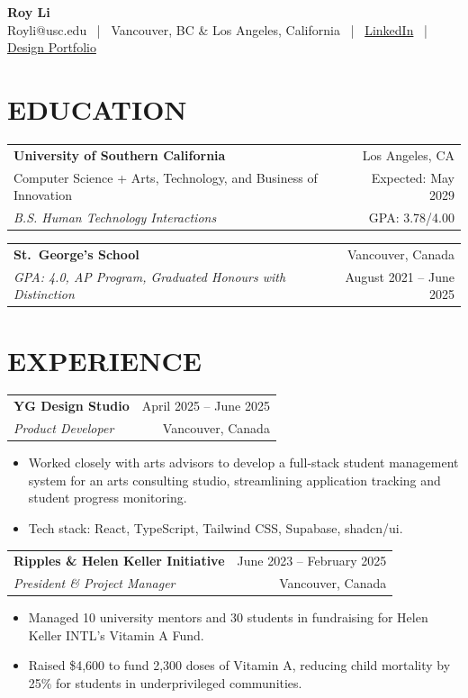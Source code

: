 \documentclass[10pt, letterpaper]{article}
\makeatletter
\newcommand{\jobheader}[4]{%
  \begin{tabularx}{\textwidth}{@{}X r@{}}
    \textbf{#1} & #2 \\
    \textit{#3} & #4 \\
  \end{tabularx}%
  \vspace{1pt}%
}
\makeatother
\begin{document}
{\Large\textbf{Roy Li}} \\[3pt]
{\small Royli@usc.edu \, | \, Vancouver, BC \& Los Angeles, California \, | \, \href{https://www.linkedin.com/in/roylixyz/}{LinkedIn} \, | \, \href{https://royli.design/}{Design Portfolio}}

\section*{EDUCATION}

\begin{tabularx}{\textwidth}{@{}X r@{}}
    \textbf{University of Southern California} & Los Angeles, CA \\
    Computer Science + Arts, Technology, and Business of Innovation & Expected: May 2029 \\
    \textit{B.S. Human Technology Interactions} & GPA: 3.78/4.00 \\
  \end{tabularx}%
  \vspace{1pt}%

\vspace{4pt}

\jobheader{St.\ George's School}{Vancouver, Canada}
          {GPA: 4.0, AP Program, Graduated Honours with Distinction}{August 2021 -- June 2025}

\section*{EXPERIENCE}

\jobheader{YG Design Studio}{April 2025 -- June 2025}
          {Product Developer}{Vancouver, Canada}
\begin{itemize}
  \item Worked closely with arts advisors to develop a full-stack student management system for an arts consulting studio, streamlining application tracking and student progress monitoring.
  \item Tech stack: React, TypeScript, Tailwind CSS, Supabase, shadcn/ui.
\end{itemize}

\vspace{4pt}

\jobheader{Ripples \& Helen Keller Initiative}{June 2023 -- February 2025}
          {President \& Project Manager}{Vancouver, Canada}
\begin{itemize}
  \item Managed 10 university mentors and 30 students in fundraising for Helen Keller INTL's Vitamin A Fund.
  \item Raised \$4,600 to fund 2,300 doses of Vitamin A, reducing child mortality by 25\% for students in underprivileged communities.
\end{itemize}
\end{document}
